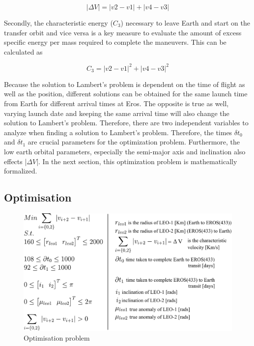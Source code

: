 \documentclass[11pt,a4paper]{article}
\newcommand*\ruleline[1]{\par\noindent\raisebox{.8ex}{\makebox[\linewidth]{\hrulefill\hspace{1ex}\raisebox{-.8ex}{#1}\hspace{1ex}\hrulefill}}}
\DeclareRobustCommand{\mysymb}{{\usefont{U}{MnSymbolC}{m}{n}\symbol{"36}}}
\begin{document}
\begin{multicols}{2}
$$|\Delta V|=|v2-v1|+|v4-v3|$$


Secondly, the characteristic energy ($C_3$) necessary to leave Earth and start on the transfer orbit and vice versa is a key measure to evaluate the amount of excess specific energy per mass required to complete the maneuvers. This can be calculated as

$$C_3=|v2-v1|^2+|v4-v3|^2$$

Because the solution to Lambert’s problem is dependent on the time of flight as well as the position, different solutions can be obtained for the same launch time from Earth for different arrival times at Eros. The opposite is true as well, varying launch date and keeping the same arrival time will also change the solution to Lambert’s problem. Therefore, there are two independent variables to analyze when finding a solution to Lambert’s problem. Therefore, the times $\delta t_0$ and $\delta t_1$ are crucial parameters for the optimization problem. Furthermore, the low earth orbital parameters, especially the semi-major axis and inclination also effects |$\Delta V$|. In the next section, this optimization problem is mathematically formalized.
\end{multicols}
\ruleline{\mysymb{} }
\begin{multicols}{2}
\section{Optimisation}\label{motivation}
\end{multicols}

\begin{figure}[H]
\centering
\includegraphics[width=\textwidth-85pt]{images/optimisation.pdf}
\caption{Optimisation problem}
\end{figure}
\end{document}
